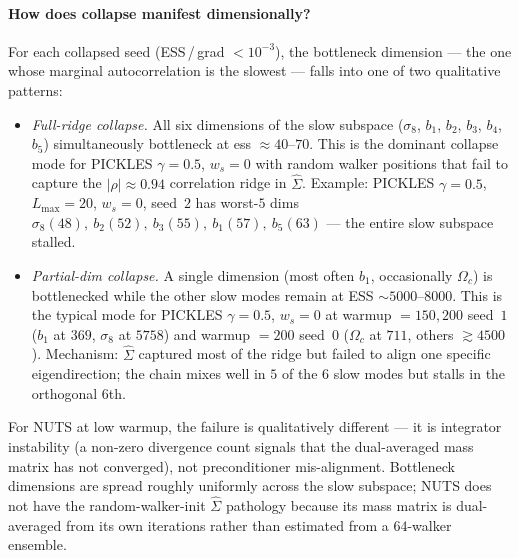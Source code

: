 \documentclass{article}
\begin{document}
\paragraph{How does collapse manifest dimensionally?}
For each collapsed seed (ESS\,/\,grad $< 10^{-3}$), the bottleneck
dimension --- the one whose marginal autocorrelation is the slowest ---
falls into one of two qualitative patterns:
\begin{itemize}\setlength\itemsep{2pt}
\item \emph{Full-ridge collapse.}  All six dimensions of the slow
subspace ($\sigma_8$, $b_1$, $b_2$, $b_3$, $b_4$, $b_5$) simultaneously
bottleneck at ess $\approx 40$--$70$.  This is the dominant collapse
mode for PICKLES $\gamma=0.5$, $w_s=0$ with random walker positions
that fail to capture the $|\rho| \approx 0.94$ correlation ridge in
$\hat\Sigma$.  Example: PICKLES $\gamma=0.5$, $L_{\max}=20$, $w_s=0$,
seed~$2$ has worst-$5$ dims $\sigma_8(48),\ b_2(52),\ b_3(55),
\ b_1(57),\ b_5(63)$ --- the entire slow subspace stalled.
\item \emph{Partial-dim collapse.}  A single dimension (most often
$b_1$, occasionally $\Omega_c$) is bottlenecked while the other slow
modes remain at ESS $\sim 5000$--$8000$.  This is the typical mode
for PICKLES $\gamma=0.5$, $w_s=0$ at warmup $=150, 200$ seed~$1$ ($b_1$ at
$369$, $\sigma_8$ at $5758$) and warmup $=200$ seed~$0$ ($\Omega_c$ at
$711$, others $\gtrsim 4500$).  Mechanism: $\hat\Sigma$ captured most of
the ridge but failed to align one specific eigendirection; the chain
mixes well in $5$ of the $6$ slow modes but stalls in the orthogonal
$6$th.
\end{itemize}
For NUTS at low warmup, the failure is qualitatively different ---
it is integrator instability (a non-zero divergence count signals
that the dual-averaged mass matrix has not converged), not preconditioner
mis-alignment.  Bottleneck dimensions are spread roughly uniformly
across the slow subspace; NUTS does not have the random-walker-init
$\hat\Sigma$ pathology because its mass matrix is dual-averaged from
its own iterations rather than estimated from a $64$-walker ensemble.
\end{document}
